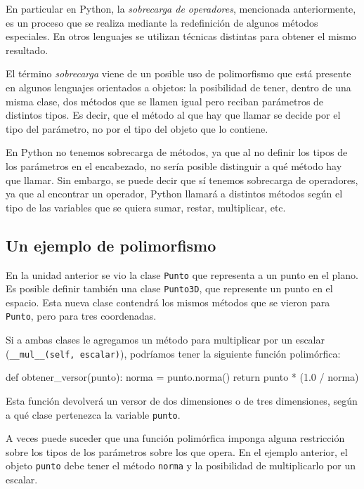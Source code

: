 En particular en Python, la {\it sobrecarga de operadores}, mencionada
anteriormente,  es un proceso que se realiza mediante la redefinición de
algunos métodos especiales.  En otros lenguajes se utilizan técnicas distintas
para obtener el mismo resultado.

\begin{sabias_que}
El término {\it sobrecarga} viene de un posible uso de polimorfismo que
está presente en algunos lenguajes orientados a objetos: la posibilidad de
tener, dentro de una misma clase, dos métodos que se llamen igual pero
reciban parámetros de distintos tipos.  Es decir, que el método al que hay
que llamar se decide por el tipo del parámetro, no por el tipo del objeto
que lo contiene.

En Python no tenemos sobrecarga de métodos, ya que al no definir los tipos
de los parámetros en el encabezado, no sería posible distinguir a qué
método hay que llamar.  Sin embargo, se puede decir que sí tenemos
sobrecarga de operadores, ya que al encontrar un operador, Python llamará a
distintos métodos según el tipo de las variables que se quiera sumar,
restar, multiplicar, etc.
\end{sabias_que}

\subsection{Un ejemplo de polimorfismo}

En la unidad anterior se vio la clase \lstinline!Punto! que representa a un
punto en el plano.  Es posible definir también una clase
\lstinline!Punto3D!, que represente un punto en el espacio.  Esta nueva
clase contendrá los mismos métodos que se vieron para \lstinline!Punto!,
pero para tres coordenadas.

Si a ambas clases le agregamos un método para multiplicar por un escalar
(\lstinline!__mul__(self, escalar)!), podríamos tener la siguiente función
polimórfica:

\begin{codigo-python-sn}
def obtener_versor(punto):
    norma = punto.norma()
    return punto * (1.0 / norma)
\end{codigo-python-sn}

Esta función devolverá un versor de dos dimensiones o de tres dimensiones,
según a qué clase pertenezca la variable \lstinline!punto!.

\begin{atencion}
A veces puede suceder que una función polimórfica imponga alguna
restricción sobre los tipos de los parámetros sobre los que opera. En el
ejemplo anterior, el objeto \lstinline!punto! debe tener el método
\lstinline!norma! y la posibilidad de multiplicarlo por un escalar.
\end{atencion}

